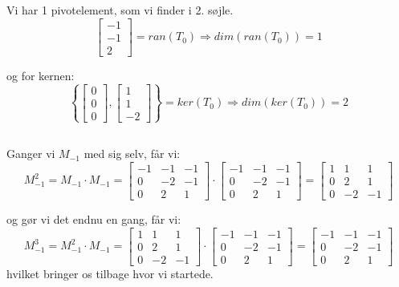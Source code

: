 \documentclass[a4paper,12pt]{article}
\begin{document}
Vi har 1 pivotelement, som vi finder i 2. søjle.\\

\[
\left[\begin{array}{ccc|c}
    -1 \\
    -1 \\
    2 
\end{array}\right]
= ran(T_{0}) \Rightarrow dim(ran(T_{0})) = 1
\]

og for kernen:\\

\[
\left\{
\left[\begin{array}{ccc|c}
    0 \\
    0 \\
    0
\end{array}\right]
,
\left[\begin{array}{ccc|c}
    1 \\
    1 \\
    -2
\end{array}\right]
\right\}
= ker(T_{0}) \Rightarrow dim(ker(T_{0})) = 2
\]

\subsection{}
Ganger vi $M_{-1}$ med sig selv, får vi:\\
\[
M_{-1}^2 = M_{-1}\cdot M_{-1}=
\left[\begin{array}{ccc}
    -1 & -1 & -1 \\
    0 & -2 & -1 \\
    0 & 2 & 1
\end{array}\right]
\cdot
\left[\begin{array}{ccc}
    -1 & -1 & -1 \\
    0 & -2 & -1 \\
    0 & 2 & 1
\end{array}\right]
=
\left[\begin{array}{ccc}
    1 & 1 & 1 \\
    0 & 2 & 1 \\
    0 & -2 & -1
\end{array}\right]
\]

og gør vi det endnu en gang, får vi:\\

\[
M_{-1}^3 = M_{-1}^2\cdot M_{-1}=
\left[\begin{array}{ccc}
    1 & 1 & 1 \\
    0 & 2 & 1 \\
    0 & -2 & -1
\end{array}\right]
\cdot
\left[\begin{array}{ccc}
    -1 & -1 & -1 \\
    0 & -2 & -1 \\
    0 & 2 & 1
\end{array}\right]
=
\left[\begin{array}{ccc}
    -1 & -1 & -1 \\
    0 & -2 & -1 \\
    0 & 2 & 1
\end{array}\right]
\]
hvilket bringer os tilbage hvor vi startede.\\
\end{document}
